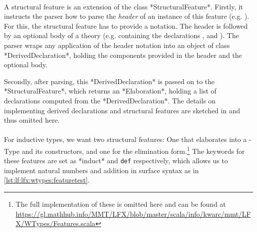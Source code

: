 \paragraph{} A structural feature is an extension of the class *StructuralFeature*. Firstly, it instructs the parser how to parse the \emph{header} of an instance of this feature (e.g. ). For this, the structural feature has to provide a notation. The header is followed by an optional body of a theory (e.g. containing the declarations ,  and ). The parser wraps any application of the header notation into an object of class *DerivedDeclaration*, holding the components provided in the header and the optional body. 

Secondly, after parsing, this *DerivedDeclaration* is passed on to the *StructuralFeature*, which returns an *Elaboration*, holding a list of \mmt declarations computed from the *DerivedDeclaration*. The details on implementing derived declarations and structural features are sketched in \cite{Iancu:phd} and thus omitted here.

%
%
%
%
%
%

\paragraph{} For inductive types, we want two structural features: One that elaborates into a \wtypesym-Type and its constructors, and one for the elimination form.\footnote{The full implementation of these is omitted here and can be found at \url{https://gl.mathhub.info/MMT/LFX/blob/master/scala/info/kwarc/mmt/LFX/WTypes/Features.scala}} The keywords for these features are set as *induct* and \lstinline|def| respectively, which allows us to implement natural numbers and addition in surface syntax as in \autoref{lst:lf:lfx:wtypes:featuretest}.

